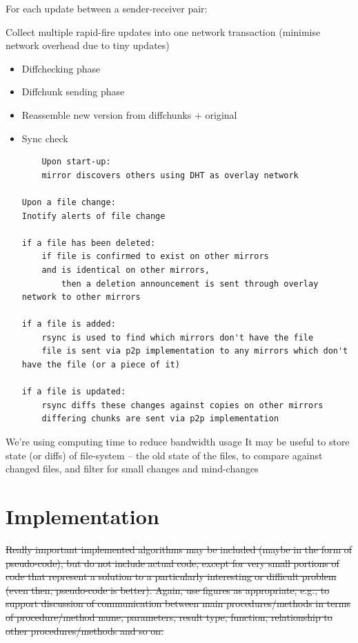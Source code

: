 \documentclass[12pt,a4paper,]{adreport}
\begin{document}
For each update between a sender-receiver pair:

Collect multiple rapid-fire updates into one network transaction
(minimise network overhead due to tiny updates)

\begin{itemize}
\item
  Diffchecking phase
\item
  Diffchunk sending phase
\item
  Reassemble new version from diffchunks + original
\item
  Sync check

\begin{verbatim}
    Upon start-up:
    mirror discovers others using DHT as overlay network

Upon a file change:
Inotify alerts of file change

if a file has been deleted:
    if file is confirmed to exist on other mirrors
    and is identical on other mirrors,
        then a deletion announcement is sent through overlay network to other mirrors

if a file is added:
    rsync is used to find which mirrors don't have the file
    file is sent via p2p implementation to any mirrors which don't have the file (or a piece of it)

if a file is updated:
    rsync diffs these changes against copies on other mirrors
    differing chunks are sent via p2p implementation
\end{verbatim}
\end{itemize}

We're using computing time to reduce bandwidth usage It may be useful to
store state (or diffs) of file-system -- the old state of the files, to
compare against changed files, and filter for small changes and
mind-changes

\chapter{Implementation}\label{implementation}

\sout{Really important implemented algorithms may be included (maybe in
the form of pseudo-code), but do not include actual code, except for
very small portions of code that represent a solution to a particularly
interesting or difficult problem (even then, pseudo-code is better).
Again, use figures as appropriate, e.g., to support discussion of
communication between main procedures/methods in terms of
procedure/method name, parameters, result type, function, relationship
to other procedures/methods and so on.}
\end{document}
